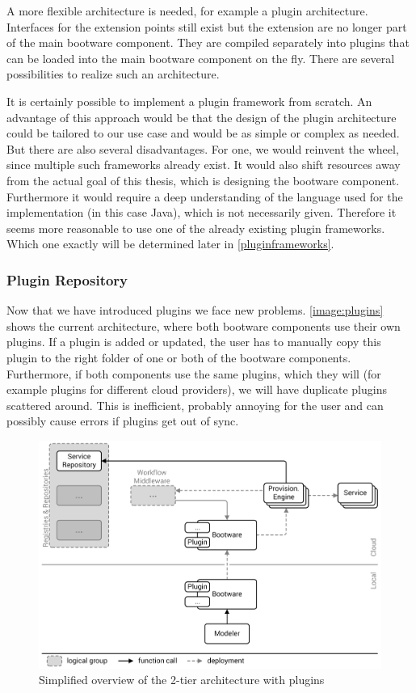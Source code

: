 A more flexible architecture is needed, for example a plugin architecture.
Interfaces for the extension points still exist but the extension are no longer part of the main bootware component.
They are compiled separately into plugins that can be loaded into the main bootware component on the fly.
There are several possibilities to realize such an architecture.

It is certainly possible to implement a plugin framework from scratch.
An advantage of this approach would be that the design of the plugin architecture could be tailored to our use case and would be as simple or complex as needed.
But there are also several disadvantages.
For one, we would reinvent the wheel, since multiple such frameworks already exist.
It would also shift resources away from the actual goal of this thesis, which is designing the bootware component.
Furthermore it would require a deep understanding of the language used for the implementation (in this case Java), which is not necessarily given.
Therefore it seems more reasonable to use one of the already existing plugin frameworks.
Which one exactly will be determined later in \autoref{pluginframeworks}.

\subsubsection{Plugin Repository}

Now that we have introduced plugins we face new problems.
\autoref{image:plugins} shows the current architecture, where both bootware components use their own plugins.
If a plugin is added or updated, the user has to manually copy this plugin to the right folder of one or both of the bootware components.
Furthermore, if both components use the same plugins, which they will (for example plugins for different cloud providers), we will have duplicate plugins scattered around.
This is inefficient, probably annoying for the user and can possibly cause errors if plugins get out of sync.

\begin{figure}[!htbp]
	\centering
	\includegraphics[resolution=600]{design/assets/simple_plugins}
	\caption{Simplified overview of the 2-tier architecture with plugins}
	\label{image:plugins}
\end{figure}

